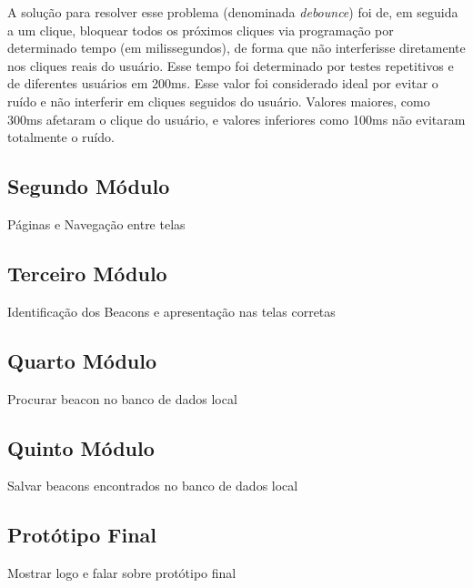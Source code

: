 \documentclass[
		12pt,				%
		openright,			%
		oneside,			%
		a4paper,			%
		chapter=TITLE,		%
		english,			%
		brazil				%
	]{abntex2}
\begin{document}
A solução para resolver esse problema (denominada \textit{debounce}) foi de, em seguida a um clique, bloquear todos os próximos cliques via programação por determinado tempo (em milissegundos), de forma que não interferisse diretamente nos cliques reais do usuário. Esse tempo foi determinado por testes repetitivos e de diferentes usuários em 200ms. Esse valor foi considerado ideal por evitar o ruído e não interferir em cliques seguidos do usuário. Valores maiores, como 300ms afetaram o clique do usuário, e valores inferiores como 100ms não evitaram totalmente o ruído.

\subsection{Segundo Módulo}\label{sec:segundo-modulo}

Páginas e Navegação entre telas

\subsection{Terceiro Módulo}\label{sec:terceiro-modulo}

Identificação dos Beacons e apresentação nas telas corretas

\subsection{Quarto Módulo}\label{sec:quarto-modulo}

Procurar beacon no banco de dados local

\subsection{Quinto Módulo}\label{sec:quinto-modulo}

Salvar beacons encontrados no banco de dados local

\subsection{Protótipo Final}\label{sec:prototipo-final}

Mostrar logo e falar sobre protótipo final
\end{document}
